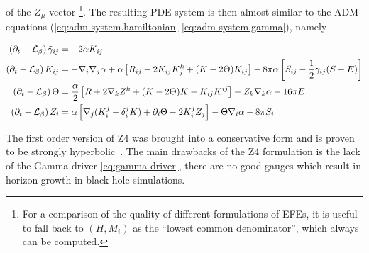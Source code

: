 of the $Z_\mu$ vector \footnote{For a comparison of the quality of 
 different formulations of EFEs, it is
 useful to fall back to $(H,M_i)$ as the ``lowest common denominator'',
 which always can be computed.}. The resulting PDE system is then almost similar
to the ADM equations (\ref{eq:adm-system.hamiltonian}-\ref{eq:adm-system.gamma}), namely
\begin{fullwidth}%
\begin{align}
	\left(\partial_t - \mathcal{L}_{\beta} \right) \tilde\gamma_{ij}
	&=
	-2\alpha K_{ij}
	\\
	\left(\partial_t - \mathcal{L}_{\beta} \right) K_{ij}
	&=
	-\nabla_i \nabla_j \alpha
	+ \alpha \left[ R_{ij} - 2 K_{ij} K^k_j + (K-2\Theta)K_{ij}
	\right]
	- 8\pi\alpha \left[ S_{ij} - \frac 12 \gamma_{ij} (S-E) \right] 
	\\
	\left(\partial_t - \mathcal{L}_{\beta} \right) \Theta
	&=
	\frac \alpha 2 \left[
	R + 2 \nabla_k Z^k + (K - 2\Theta)K - K_{ij} K^{ij}
	\right]
	- Z_k \nabla_k \alpha  
	- 16 \pi E
	\\
	\left(\partial_t - \mathcal{L}_{\beta} \right) Z_i
	&=
	\alpha \left[ \nabla_j (K_i^j - \delta_i^j K)
	+ \partial_i \Theta - 2 K_i^j Z_j \right]
	- \Theta \nabla_i \alpha
	- 8\pi S_i
	\end{align}
\end{fullwidth}
%
The first order version of Z4 was brought into a conservative form and is
proven to be strongly hyperbolic~\cite{Alic:2009}.
The main drawbacks of the Z4 formulation is the lack of the 
Gamma driver
\eqref{eq:gamma-driver}, \ie there are no good gauges which 
result in horizon 
growth in black hole simulations.

%
